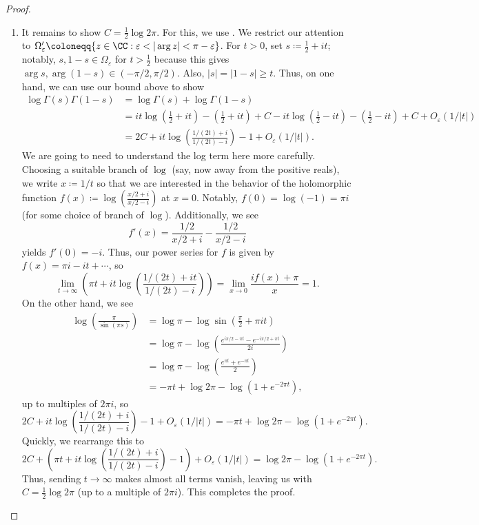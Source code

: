 \documentclass[../notes.tex]{subfiles}
\begin{document}
\begin{proof}
\begin{enumerate}
		\item It remains to show $C=\frac12\log2\pi$. For this, we use . We restrict our attention to $\Omega'_\varepsilon\coloneqq\{z\in\CC:\varepsilon<|\arg z|<\pi-\varepsilon\}$. For $t>0$, set $s\coloneqq\frac12+it$; notably, $s,1-s\in\Omega_\varepsilon$ for $t>\frac12$ because this gives $\arg s,\arg(1-s)\in(-\pi/2,\pi/2)$. Also, $|s|=|1-s|\ge t$. Thus, on one hand, we can use our bound above to show
		\begin{align*}
			\log\Gamma(s)\Gamma(1-s) &= \log\Gamma(s)+\log\Gamma(1-s) \\
			&= it\log\left(\frac12+it\right)-\left(\frac12+it\right)+C-it\log\left(\frac12-it\right)-\left(\frac12-it\right)+C+O_\varepsilon(1/|t|) \\
			&= 2C+it\log\left(\frac{1/(2t)+i}{1/(2t)-i}\right)-1+O_\varepsilon(1/|t|).
		\end{align*}
		We are going to need to understand the log term here more carefully. Choosing a suitable branch of $\log$ (say, now away from the positive reals), we write $x\coloneqq1/t$ so that we are interested in the behavior of the holomorphic function $f(x)\coloneqq\log\left(\frac{x/2+i}{x/2-i}\right)$ at $x=0$. Notably, $f(0)=\log(-1)=\pi i$ (for some choice of branch of $\log$). Additionally, we see
		\[f'(x)=\frac{1/2}{x/2+i}-\frac{1/2}{x/2-i}\]
		yields $f'(0)=-i$. Thus, our power series for $f$ is given by $f(x)=\pi i-it+\cdots$,
		so
		\[\lim_{t\to\infty}\left(\pi t+it\log\left(\frac{1/(2t)+it}{1/(2t)-i}\right)\right)=\lim_{x\to0}\frac{if(x)+\pi}x=1.\]
		On the other hand, we see
		\begin{align*}
			\log\left(\frac\pi{\sin(\pi s)}\right) &= \log\pi-\log\sin\left(\frac\pi2+\pi it\right) \\
			&= \log\pi-\log\left(\frac{e^{i\pi/2-\pi t}-e^{-i\pi/2+\pi t}}{2i}\right) \\
			&= \log\pi-\log\left(\frac{e^{\pi t}+e^{-\pi t}}{2}\right) \\
			&= -\pi t+\log2\pi-\log\left(1+e^{-2\pi t}\right),
		\end{align*}
		up to multiples of $2\pi i$, so
		\[2C+it\log\left(\frac{1/(2t)+i}{1/(2t)-i}\right)-1+O_\varepsilon(1/|t|)=-\pi t+\log2\pi-\log\left(1+e^{-2\pi t}\right).\]
		Quickly, we rearrange this to
		\[2C+\left(\pi t+it\log\left(\frac{1/(2t)+i}{1/(2t)-i}\right)-1\right)+O_\varepsilon(1/|t|)=\log2\pi-\log\left(1+e^{-2\pi t}\right).\]
		Thus, sending $t\to\infty$ makes almost all terms vanish, leaving us with $C=\frac12\log2\pi$ (up to a multiple of $2\pi i$). This completes the proof.
		\qedhere
	\end{enumerate}
\end{proof}
\end{document}
